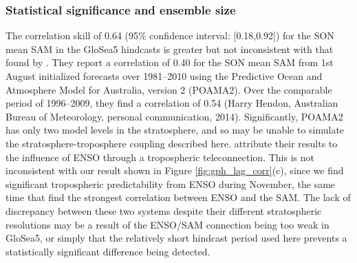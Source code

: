 \subsubsection{Statistical significance and ensemble size}

The correlation skill of 0.64 (95\% confidence interval: [0.18,0.92]) for the
SON mean SAM in the GloSea5 hindcasts is greater but not inconsistent with that
found by \citet{Lim2013}. They report a correlation of 0.40 for the SON mean SAM
from 1st August initialized forecasts over 1981--2010 using the Predictive Ocean
and Atmosphere Model for Australia, version 2 (POAMA2). Over the comparable
period of 1996--2009, they find a correlation of 0.54 (Harry Hendon, Australian
Bureau of Meteorology, personal communication, 2014).  Significantly, POAMA2 has
only two model levels in the stratosphere, and so may be unable to simulate the
stratosphere-troposphere coupling described here. \citet{Lim2013} attribute
their results to the influence of ENSO through a tropospheric
teleconnection. This is not inconsistent with our result shown in Figure
\ref{fig:gph_lag_corr}(c), since we find significant tropospheric predictability
from ENSO during November, the same time that \citet{Lim2013} find the strongest
correlation between ENSO and the SAM. The lack of discrepancy between these two
systems despite their different stratospheric resolutions may be a result of the
ENSO/SAM connection being too weak in GloSea5, or simply that the relatively
short hindcast period used here prevents a statistically significant difference
being detected.

